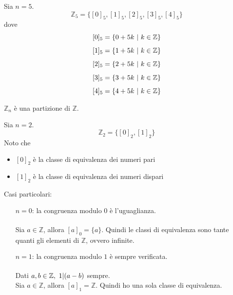 \documentclass[a4paper,12pt, oneside]{book}
\begin{document}
\begin{shaded}
	\begin{esempio}
		Sia $n=5$.\\
		$$\mathbb{Z}_5 = \{ [0]_5,[1]_5,[2]_5,[3]_5,[4]_5  \}$$
		dove
		$$[0]_5 = \{ 0+5k \mbox{\space}|\mbox{\space} k \in \mathbb{Z} \}$$
		$$[1]_5 = \{ 1+5k \mbox{\space}|\mbox{\space} k \in \mathbb{Z} \}$$
		$$[2]_5 = \{ 2+5k \mbox{\space}|\mbox{\space} k \in \mathbb{Z} \}$$
		$$[3]_5 = \{ 3+5k \mbox{\space}|\mbox{\space} k \in \mathbb{Z} \}$$
		$$[4]_5 = \{ 4+5k \mbox{\space}|\mbox{\space} k \in \mathbb{Z} \}$$
	\end{esempio}
\end{shaded}
\begin{nota}
	$\mathbb{Z}_n$ è una partizione di $\mathbb{Z}$.
\end{nota}
\begin{shaded}
	\begin{esempio}
		Sia $n=2$.\\
		$$\mathbb{Z}_2 = \{ [0]_2,[1]_2  \}$$
		Noto che \begin{itemize}
			\item $[0]_2$ è la classe di equivalenza dei numeri pari
			\item $[1]_2$ è la classe di equivalenza dei numeri dispari
		\end{itemize}
	\end{esempio}
\end{shaded}
\begin{osservazione}
	Casi particolari:
	\begin{enumerate}
		\item [$n = 0$: ] la congruenza modulo $0$ è l'uguaglianza.\\\\
		      Sia $a \in \mathbb{Z}$, allora $[a]_0 = \{a\}$. Quindi le classi di equivalenza sono tante quanti gli elementi di $\mathbb{Z}$, ovvero infinite.
		\item [$n = 1$: ] la congruenza modulo $1$ è sempre verificata.\\\\
		      Dati $a,b \in \mathbb{Z}, \mbox{\space} 1|(a-b)$ sempre.\\
		      Sia $a \in \mathbb{Z}$, allora $[a]_1 = \mathbb{Z}$. Quindi ho una sola classe di equivalenza.
	\end{enumerate}
\end{osservazione}
\end{document}
